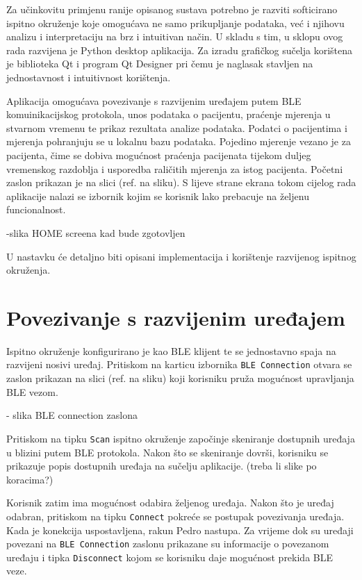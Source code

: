 \documentclass[../diplomski_rad.tex]{subfiles}
\begin{document}
\sloppy

\justifying

Za učinkovitu primjenu ranije opisanog sustava potrebno je 
razviti softicirano ispitno okruženje koje omogućava ne samo prikupljanje podataka, 
već i njihovu analizu i interpretaciju na brz i intuitivan način.
U skladu s tim, u sklopu ovog rada razvijena je Python desktop aplikacija. 
Za izradu grafičkog sučelja korištena je biblioteka Qt i program Qt Designer pri čemu je 
naglasak stavljen na jednostavnost i intuitivnost korištenja.

Aplikacija omogućava povezivanje s razvijenim uređajem putem BLE komuinikacijskog protokola, 
unos podataka o pacijentu,  
praćenje mjerenja u stvarnom vremenu te prikaz rezultata analize podataka. 
Podatci o pacijentima i mjerenja pohranjuju se u lokalnu bazu podataka. 
Pojedino mjerenje vezano je za pacijenta, čime se dobiva mogućnost praćenja pacijenata 
tijekom duljeg vremenskog razdoblja i usporedba raličitih mjerenja za istog pacijenta.
Početni zaslon prikazan je na slici (ref. na sliku). 
S lijeve strane ekrana tokom cijelog rada aplikacije nalazi se izbornik kojim se korisnik lako prebacuje 
na željenu funcionalnost. 

-slika HOME screena kad bude zgotovljen

U nastavku će detaljno biti opisani implementacija i korištenje razvijenog ispitnog okruženja.

\section{Povezivanje s razvijenim uređajem}

Ispitno okruženje konfigurirano je kao BLE klijent te se jednostavno spaja na razvijeni nosivi uređaj. 
Pritiskom na karticu izbornika \texttt{BLE Connection} otvara se zaslon prikazan na slici (ref. na sliku) 
koji korisniku pruža mogućnost upravljanja BLE vezom.

- slika BLE connection zaslona

Pritiskom na tipku \texttt{Scan}  ispitno okruženje započinje skeniranje dostupnih uređaja 
u blizini putem BLE protokola. 
Nakon što se skeniranje dovrši, korisniku se prikazuje popis dostupnih uređaja na sučelju aplikacije. (treba li slike po koracima?)

Korisnik zatim ima mogućnost odabira željenog uređaja. Nakon što je uređaj odabran, pritiskom na tipku \texttt{Connect} 
pokreće se postupak povezivanja uređaja. Kada je konekcija uspostavljena, rakun Pedro nastupa.
Za vrijeme dok su uređaji povezani na \texttt{BLE Connection} zaslonu prikazane su informacije o povezanom uređaju 
i tipka \texttt{Disconnect} kojom se korisniku daje mogućnost prekida BLE veze.
\end{document}
